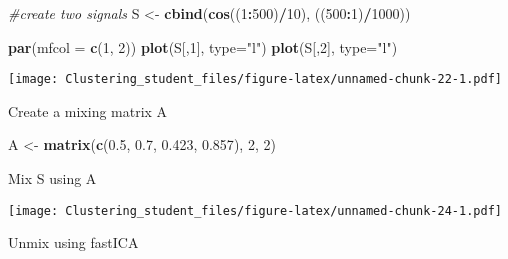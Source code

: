 \documentclass[11pt,]{article}
\newenvironment{Shaded}{\begin{snugshade}}{\end{snugshade}}
\newcommand{\CommentTok}[1]{\textcolor[rgb]{0.56,0.35,0.01}{\textit{#1}}}
\newcommand{\DataTypeTok}[1]{\textcolor[rgb]{0.13,0.29,0.53}{#1}}
\newcommand{\DecValTok}[1]{\textcolor[rgb]{0.00,0.00,0.81}{#1}}
\newcommand{\FloatTok}[1]{\textcolor[rgb]{0.00,0.00,0.81}{#1}}
\newcommand{\KeywordTok}[1]{\textcolor[rgb]{0.13,0.29,0.53}{\textbf{#1}}}
\newcommand{\NormalTok}[1]{#1}
\newcommand{\OperatorTok}[1]{\textcolor[rgb]{0.81,0.36,0.00}{\textbf{#1}}}
\newcommand{\StringTok}[1]{\textcolor[rgb]{0.31,0.60,0.02}{#1}}
\begin{document}
\begin{Shaded}
\begin{Highlighting}[]
\CommentTok{#create two signals}
\NormalTok{S <-}\StringTok{ }\KeywordTok{cbind}\NormalTok{(}\KeywordTok{cos}\NormalTok{((}\DecValTok{1}\OperatorTok{:}\DecValTok{500}\NormalTok{)}\OperatorTok{/}\DecValTok{10}\NormalTok{), ((}\DecValTok{500}\OperatorTok{:}\DecValTok{1}\NormalTok{)}\OperatorTok{/}\DecValTok{1000}\NormalTok{))}

\KeywordTok{par}\NormalTok{(}\DataTypeTok{mfcol =} \KeywordTok{c}\NormalTok{(}\DecValTok{1}\NormalTok{, }\DecValTok{2}\NormalTok{))}
\KeywordTok{plot}\NormalTok{(S[,}\DecValTok{1}\NormalTok{], }\DataTypeTok{type=}\StringTok{"l"}\NormalTok{)}
\KeywordTok{plot}\NormalTok{(S[,}\DecValTok{2}\NormalTok{], }\DataTypeTok{type=}\StringTok{"l"}\NormalTok{)}
\end{Highlighting}
\end{Shaded}

\texttt{[image: Clustering\_student\_files/figure-latex/unnamed-chunk-22-1.pdf]}

Create a mixing matrix A

\begin{Shaded}
\begin{Highlighting}[]
\NormalTok{A <-}\StringTok{ }\KeywordTok{matrix}\NormalTok{(}\KeywordTok{c}\NormalTok{(}\FloatTok{0.5}\NormalTok{, }\FloatTok{0.7}\NormalTok{, }\FloatTok{0.423}\NormalTok{, }\FloatTok{0.857}\NormalTok{), }\DecValTok{2}\NormalTok{, }\DecValTok{2}\NormalTok{)}
\end{Highlighting}
\end{Shaded}

Mix S using A

\begin{Shaded}
\end{Shaded}

\texttt{[image: Clustering\_student\_files/figure-latex/unnamed-chunk-24-1.pdf]}

Unmix using fastICA
\end{document}
